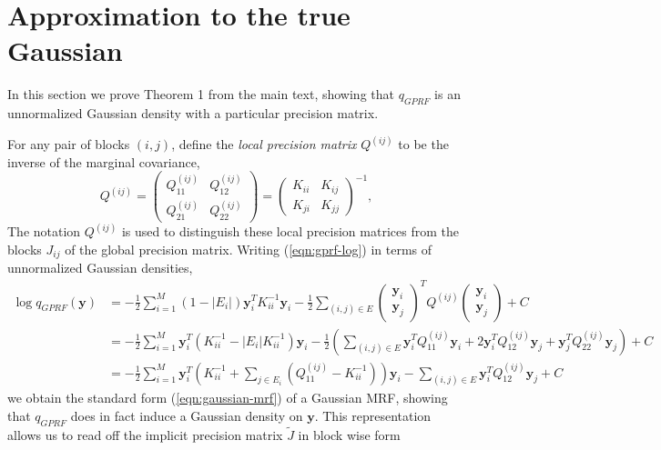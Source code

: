 \documentclass{article}
\renewcommand{\v}[1]{\mathbf{#1}}
\begin{document}
\section{Approximation to the true Gaussian}
\label{sec:approx-gaussian}

In this section we prove Theorem 1 from the main text, showing that $q_{GPRF}$ is an unnormalized Gaussian density with a particular precision matrix. 

For any pair of blocks $(i,j)$, define the {\em local precision  matrix} $Q^{(ij)}$ to be the inverse of the marginal covariance,
\[Q^{(ij)} = \left(\begin{array}{cc} Q^{(ij)}_{11} &  Q^{(ij)}_{12}\\
  Q^{(ij)}_{21}  & Q^{(ij)}_{22}\end{array}\right) = \left(\begin{array}{cc} K_{ii} &  K_{ij}\\
  K_{ji}  & K_{jj}\end{array}\right)^{-1},\]
The notation $Q^{(ij)}$ is used to distinguish these local precision
matrices from the blocks $J_{ij}$ of the global precision matrix. Writing (\ref{eqn:gprf-log}) in terms of unnormalized Gaussian densities,
\begin{align*}
\log q_{GPRF}(\v{y}) &= -\frac{1}{2} \sum_{i=1}^M (1-|E_i|) \v{y}_i^T
K_{ii}^{-1} \v{y}_i -\frac{1}{2}  \sum_{(i,j)\in E} \left(\begin{array}{c}
      \v{y}_i \\ \v{y}_j\end{array}\right)^T Q^{(ij)}\left(\begin{array}{c}
      \v{y}_i \\
      \v{y}_j\end{array}\right) + C\\
&= -\frac{1}{2}\sum_{i=1}^M  \v{y}_i^T \left(K_{ii}^{-1} - |E_i|
  K_{ii}^{-1}\right)\v{y}_i -\frac{1}{2}  \left(\sum_{(i,j)\in E} \v{y}_i^T
Q^{(ij)}_{11} \v{y}_i + 2\v{y}_i^T Q^{(ij)}_{12}\v{y}_j + \v{y}_j^T Q^{(ij)}_{22}\v{y}_j\right) + C\\
&= -\frac{1}{2}\sum_{i=1}^M  \v{y}_i^T \left(K_{ii}^{-1} + \sum_{j\in E_i}
\left(Q^{(ij)}_{11} - K_{ii}^{-1}\right) \right)\v{y}_i - \sum_{(i,j)\in E}
\v{y}_i^T Q^{(ij)}_{12} \v{y}_j + C
\end{align*}
we obtain the standard form (\ref{eqn:gaussian-mrf}) of a Gaussian
MRF, showing that $q_{GPRF}$ does in fact induce a Gaussian density on
$\v{y}$. This
representation allows us to read off the implicit precision matrix $\tilde{J}$ in block wise form
\end{document}
